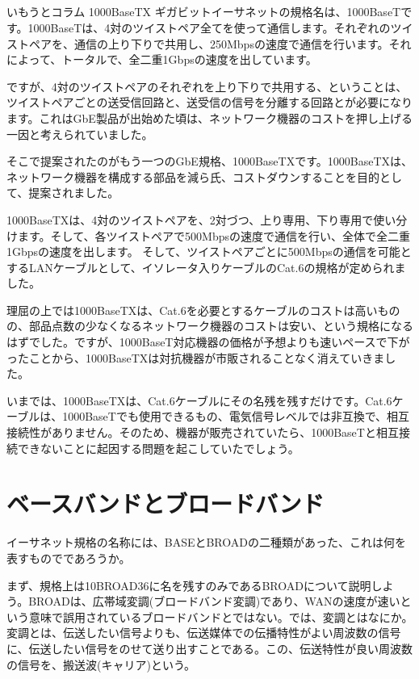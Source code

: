 \subsection*{}
\begin{itembox}[l]{いもうとコラム 1000BaseTX}
ギガビットイーサネットの規格名は、1000BaseTです。1000BaseTは、4対のツイストペア全てを使って通信します。それぞれのツイストペアを、通信の上り下りで共用し、250Mbpsの速度で通信を行います。それによって、トータルで、全二重1Gbpsの速度を出しています。

ですが、4対のツイストペアのそれぞれを上り下りで共用する、ということは、ツイストペアごとの送受信回路と、送受信の信号を分離する回路とが必要になります。これはGbE製品が出始めた頃は、ネットワーク機器のコストを押し上げる一因と考えられていました。

そこで提案されたのがもう一つのGbE規格、1000BaseTXです。1000BaseTXは、ネットワーク機器を構成する部品を減ら氏、コストダウンすることを目的として、提案されました。

1000BaseTXは、4対のツイストペアを、2対づつ、上り専用、下り専用で使い分けます。そして、各ツイストペアで500Mbpsの速度で通信を行い、全体で全二重1Gbpsの速度を出します。
そして、ツイストペアごとに500Mbpsの通信を可能とするLANケーブルとして、イソレータ入りケーブルのCat.6の規格が定められました。

理屈の上では1000BaseTXは、Cat.6を必要とするケーブルのコストは高いものの、部品点数の少なくなるネットワーク機器のコストは安い、という規格になるはずでした。ですが、1000BaseT対応機器の価格が予想よりも速いペースで下がったことから、1000BaseTXは対抗機器が市販されることなく消えていきました。

いまでは、1000BaseTXは、Cat.6ケーブルにその名残を残すだけです。Cat.6ケーブルは、1000BaseTでも使用できるもの、電気信号レベルでは非互換で、相互接続性がありません。そのため、機器が販売されていたら、1000BaseTと相互接続できないことに起因する問題を起こしていたでしょう。


\end{itembox}


\section{ベースバンドとブロードバンド}

イーサネット規格の名称には、BASEとBROADの二種類があった、これは何を表すものでであろうか。

まず、規格上は10BROAD36に名を残すのみであるBROADについて説明しよう。BROADは、広帯域変調(ブロードバンド変調)であり、WANの速度が速いという意味で誤用されているブロードバンドとではない。では、変調とはなにか。変調とは、伝送したい信号よりも、伝送媒体での伝播特性がよい周波数の信号に、伝送したい信号をのせて送り出すことである。この、伝送特性が良い周波数の信号を、搬送波(キャリア)という。

